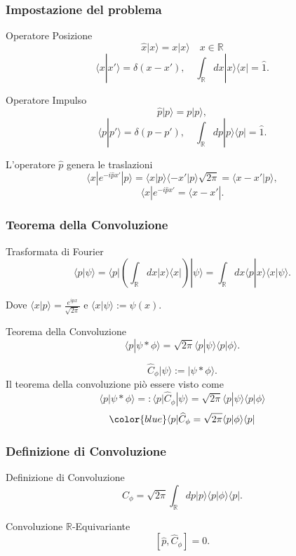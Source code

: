 \documentclass[xcolor=dvipsnames]{beamer}
\newcommand{\R}{\mathbb{R}}
\begin{document}
\begin{frame}
    \frametitle{Impostazione del problema}
    \begin{block}{Operatore Posizione}
        \[ \widehat{x}|x\rangle = x | x \rangle \quad x \in \R \]
        \[ \langle x | x' \rangle = \delta(x-x'), \quad
    \int_{\R} dx | x \rangle \langle x | = \widehat{1} .\]
    \end{block}
    \begin{block}{Operatore Impulso}
    \[ \widehat{p} | p \rangle = p | p \rangle, \]
    \[ \langle p | p' \rangle = \delta(p-p'), \quad
    \int_{\R} dp | p \rangle \langle p | = \widehat{1} .\]
    \end{block}
    L'operatore $\widehat{p}$ genera le traslazioni
        \[ \langle x | e^{-i \widehat{p} x'} | p \rangle = \langle x | p \rangle \langle -x' | p \rangle \sqrt{2 \pi} = \langle x-x' | p \rangle, \]
        \[ \langle x | e^{-i \widehat{p} x'} = \langle x-x' | .  \]
\end{frame}

\begin{frame}
    \frametitle{Teorema della Convoluzione}
    \begin{block}{Trasformata di Fourier}
        \[ \langle p | \psi \rangle = \langle p | \left( \int_{\R} dx | x \rangle \langle x| \right) | \psi \rangle = 
         \int_{\R} dx \langle p | x \rangle \langle x | \psi \rangle. \]
    \end{block}
    Dove $\langle x | p \rangle = \frac{e^{ipx}}{\sqrt{2 \pi} }$ e $\langle x | \psi \rangle := \psi(x) $.
    \begin{block}{Teorema della Convoluzione}
        \[ \langle p | \psi * \phi \rangle = \sqrt{2\pi} \langle p | \psi \rangle \langle p | \phi \rangle . \]
    \end{block}
   \[ \widehat{C}_\phi | \psi \rangle  := | \psi * \phi \rangle . \]
    Il teorema della convoluzione piò essere visto come
    \[ \langle p | \psi * \phi \rangle =: \langle p | \widehat{C}_\phi |\psi \rangle = \sqrt{2\pi} \langle p | \psi \rangle \langle p | \phi \rangle \]
   \[ {\color{blue} \langle p | \widehat{C}_\phi = \sqrt{2\pi} \langle p | \phi \rangle \langle p | }\]
\end{frame}

\begin{frame}
    \frametitle{Definizione di Convoluzione}
    \begin{block}{Definizione di Convoluzione}
        \[ \widehat{C}_\phi = \sqrt{2\pi} \int_\R dp | p \rangle \langle p | \phi \rangle \langle p | . \]
    \end{block}
    \begin{block}{Convoluzione $\R$-Equivariante}
        \Large
        \[ [ \widehat{p}, \widehat{C}_\phi] = 0 .\]
    \end{block}
\end{frame}
\end{document}
